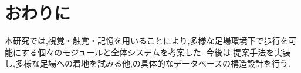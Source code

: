 \documentclass[twocolumn]{preport}
\begin{document}


\section{おわりに}
本研究では,視覚・触覚・記憶を用いることにより,多様な足場環境下で歩行を可能にする個々のモジュールと全体システムを考案した.
今後は,提案手法を実装し,多様な足場への着地を試みる他,の具体的なデータベースの構造設計を行う.




\small


\end{document}
